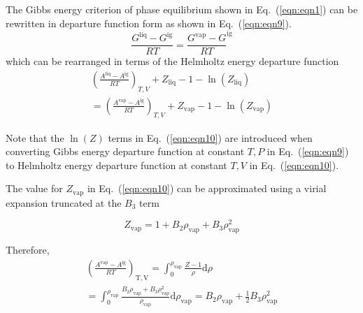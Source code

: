 \documentclass[5p,times]{elsarticle}
\begin{document}
The Gibbs energy criterion of phase equilibrium shown in Eq.~(\ref{eqn:eqn1}) can be rewritten in departure function form as shown in Eq.~(\ref{eqn:eqn9}).
\begin{equation}
\frac{G^{\mathrm{liq}} -G^{\mathrm{ig}} }{RT} =\frac{G^{\mathrm{vap}} -G}{RT} ^{\mathrm{ig}} \label{eqn:eqn9}
\end{equation}
which can be rearranged in terms of the Helmholtz energy departure function
\begin{equation}
\begin{array}{l}
{\left(\frac{A^{\mathrm{liq}} -A^{\mathrm{ig}} }{RT} \right)_{T,V} +Z_{\mathrm{liq}} -1-\ln(Z_{\mathrm{liq}})} 
\\ 
{=\left(\frac{A^{\mathrm{vap}} -A^{\mathrm{ig}} }{RT} \right)_{T,V} +Z_{\mathrm{vap}} -1-\ln(Z_{\mathrm{vap}})}  
\end{array} 
\label{eqn:eqn10}
\end{equation}

Note that the $\ln(Z)$ terms in Eq.~(\ref{eqn:eqn10}) are introduced when converting Gibbs energy departure function at constant $T,P$ in Eq.~(\ref{eqn:eqn9}) to Helmholtz energy departure function at constant $T,V$ in Eq.~(\ref{eqn:eqn10}).

The value for $Z_{\mathrm{vap}}$ in Eq.~(\ref{eqn:eqn10}) can be approximated using a virial expansion truncated at the $B_3$ term

\begin{equation}
{Z_{\mathrm{vap}}} = 1 + {B_2}{\rho_{\mathrm{vap}}} + {B_3}\rho_{\mathrm{vap}}^2
\label{eqn:eqn11}
\end{equation}

Therefore, 
\begin{equation}
\begin{array}{l}{\left( {\frac{{{A^{\mathrm{vap}}} - {A^{\mathrm{ig}}}}}{{RT}}} \right)_{\mathrm{T,V}}} = \int_0^{{\rho _{\mathrm{vap}}}} {\frac{{Z - 1}}{\rho } \mathrm{d}\rho } \\ = \int_0^{{\rho
_{\mathrm{vap}}}} {\frac{{{B_2}{\rho _{\mathrm{vap}}} + {B_3}\rho _{\mathrm{vap}}^2}}{\rho_{\mathrm{vap}} } \mathrm{d}\rho_{\mathrm{vap}} } = {B_2}{\rho _{\mathrm{vap}}} + \frac{1}{2}{B_3}\rho _{\mathrm{vap}}^2\end{array} \label{eqn:eqn12}
\end{equation}
\end{document}

